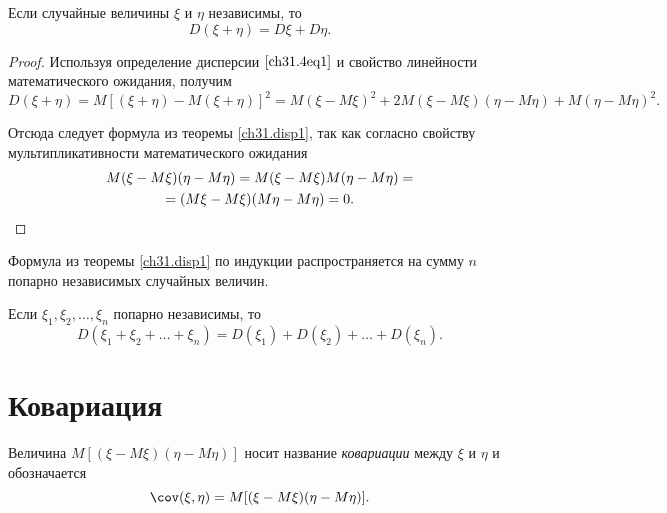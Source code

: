 \begin{thm}\label{ch31.disp1}
Если случайные величины $\xi$ и $\eta$ независимы, то $$D(\xi + \eta) = D\xi + D\eta.$$
\end{thm}
\begin{proof}
Используя определение дисперсии $\eqref{ch31.4eq1}$ и свойство линейности математического ожидания, получим
$$
D(\xi + \eta) = M[(\xi + \eta) - M(\xi + \eta)]^2 = M(\xi - M\xi)^2 + 2M(\xi - M\xi)(\eta - M\eta) + M(\eta  - M\eta)^2.
$$

Отсюда следует формула из теоремы \ref{ch31.disp1}, так как согласно свойству мультипликативности математического ожидания
\begin{multline*}
M(\xi - M\xi)(\eta - M\eta) = M(\xi - M\xi)M(\eta - M\eta) =\\= (M\xi - M\xi)(M\eta - M\eta) = 0.\qedhere
\end{multline*}
\end{proof}

Формула из теоремы \ref{ch31.disp1} по индукции распространяется на сумму $n$ попарно независимых случайных величин. 
\begin{cons}
Если $\xi_1,\xi_2, \ldots, \xi_n$ попарно независимы, то 
$$
D(\xi_1 + \xi_2 + \ldots + \xi_n) = D(\xi_1) + D(\xi_2) + \ldots + D(\xi_n).
$$
\end{cons}

\section{Ковариация}
\begin{defn}
Величина $M[(\xi - M\xi)(\eta - M\eta)]$ носит название \textit{ковариации} между $\xi$ и $\eta$ и обозначается $$\cov (\xi,\eta) = M[(\xi - M\xi)(\eta - M\eta)].$$
\end{defn}


